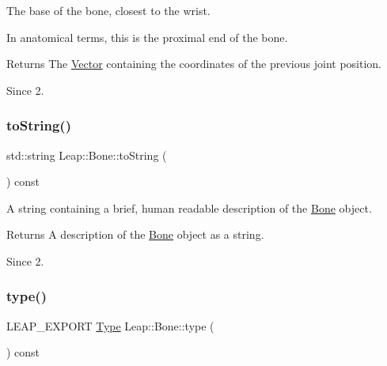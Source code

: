 The base of the bone, closest to the wrist.

In anatomical terms, this is the proximal end of the bone.


\begin{DoxyCodeInclude}
\end{DoxyCodeInclude}


\begin{DoxyReturn}{Returns}
The \hyperlink{struct_leap_1_1_vector}{Vector} containing the coordinates of the previous joint position. 
\end{DoxyReturn}
\begin{DoxySince}{Since}
2. 
\end{DoxySince}
\mbox{\label{class_leap_1_1_bone_ae628cd1722bdef446ff37679b5f28481}} 
\subsubsection{\texorpdfstring{to\+String()}{toString()}}
{\footnotesize\ttfamily std\+::string Leap\+::\+Bone\+::to\+String (\begin{DoxyParamCaption}{ }\end{DoxyParamCaption}) const\hspace{0.3cm}{\ttfamily [inline]}}

A string containing a brief, human readable description of the \hyperlink{class_leap_1_1_bone}{Bone} object.


\begin{DoxyCodeInclude}
\end{DoxyCodeInclude}


\begin{DoxyReturn}{Returns}
A description of the \hyperlink{class_leap_1_1_bone}{Bone} object as a string. 
\end{DoxyReturn}
\begin{DoxySince}{Since}
2. 
\end{DoxySince}
\mbox{\label{class_leap_1_1_bone_aa4d62475c2bd1fd0ae8cf218d220d0d8}} 
\subsubsection{\texorpdfstring{type()}{type()}}
{\footnotesize\ttfamily L\+E\+A\+P\+\_\+\+E\+X\+P\+O\+RT \hyperlink{class_leap_1_1_bone_ac2f949e05b22edc21a308df42580b5e1}{Type} Leap\+::\+Bone\+::type (\begin{DoxyParamCaption}{ }\end{DoxyParamCaption}) const}

